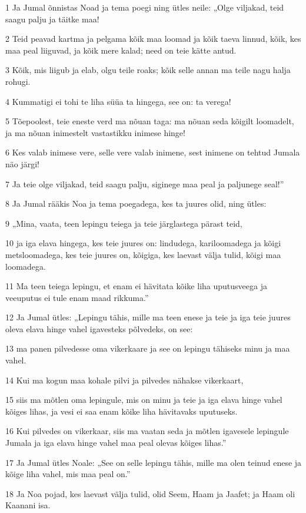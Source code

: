 \par 1 Ja Jumal õnnistas Noad ja tema poegi ning ütles neile: „Olge viljakad, teid saagu palju ja täitke maa!
\par 2 Teid peavad kartma ja pelgama kõik maa loomad ja kõik taeva linnud, kõik, kes maa peal liiguvad, ja kõik mere kalad; need on teie kätte antud.
\par 3 Kõik, mis liigub ja elab, olgu teile roaks; kõik selle annan ma teile nagu halja rohugi.
\par 4 Kummatigi ei tohi te liha süüa ta hingega, see on: ta verega!
\par 5 Tõepoolest, teie eneste verd ma nõuan taga: ma nõuan seda kõigilt loomadelt, ja ma nõuan inimestelt vastastikku inimese hinge!
\par 6 Kes valab inimese vere, selle vere valab inimene, sest inimene on tehtud Jumala näo järgi!
\par 7 Ja teie olge viljakad, teid saagu palju, siginege maa peal ja paljunege seal!”
\par 8 Ja Jumal rääkis Noa ja tema poegadega, kes ta juures olid, ning ütles:
\par 9 „Mina, vaata, teen lepingu teiega ja teie järglastega pärast teid,
\par 10 ja iga elava hingega, kes teie juures on: lindudega, kariloomadega ja kõigi metsloomadega, kes teie juures on, kõigiga, kes laevast välja tulid, kõigi maa loomadega.
\par 11 Ma teen teiega lepingu, et enam ei hävitata kõike liha uputusveega ja veeuputus ei tule enam maad rikkuma.”
\par 12 Ja Jumal ütles: „Lepingu tähis, mille ma teen enese ja teie ja iga teie juures oleva elava hinge vahel igavesteks põlvedeks, on see:
\par 13 ma panen pilvedesse oma vikerkaare ja see on lepingu tähiseks minu ja maa vahel.
\par 14 Kui ma kogun maa kohale pilvi ja pilvedes nähakse vikerkaart,
\par 15 siis ma mõtlen oma lepingule, mis on minu ja teie ja iga elava hinge vahel kõiges lihas, ja vesi ei saa enam kõike liha hävitavaks uputuseks.
\par 16 Kui pilvedes on vikerkaar, siis ma vaatan seda ja mõtlen igavesele lepingule Jumala ja iga elava hinge vahel maa peal olevas kõiges lihas.”
\par 17 Ja Jumal ütles Noale: „See on selle lepingu tähis, mille ma olen teinud enese ja kõige liha vahel, mis maa peal on.”
\par 18 Ja Noa pojad, kes laevast välja tulid, olid Seem, Haam ja Jaafet; ja Haam oli Kaanani isa.
